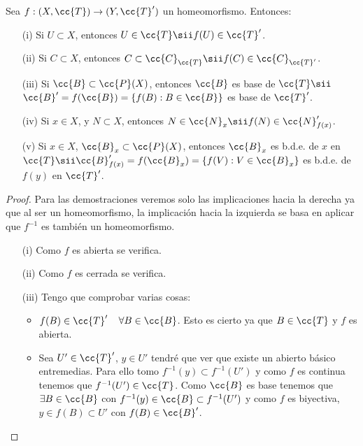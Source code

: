 \begin{prop}
    Sea $f:(X, \cc{T})\to (Y, \cc{T}')$ un homeomorfismo. Entonces:
    \begin{enumerate}
        \item[(i)] Si $U\subset X$, entonces $U\in \cc{T}\sii f(U)\in \cc{T}'$.
        \item[(ii)] Si $C\subset X$, entonces $C\subset \cc{C}_{\cc{T}} \sii f(C)\in \cc{C}_{\cc{T}'}$.
        \item[(iii)] Si $\cc{B}\subset\cc{P}(X)$, entonces $\cc{B}$ es base de $\cc{T} \sii $ $\cc{B}'=f(\cc{B})=\{f(B):B\in \cc{B}\}$ es base de $\cc{T}'$.
        \item[(iv)] Si $x\in X$, y $N\subset X$, entonces $N\in \cc{N}_x \sii f(N)\in \cc{N}_{f(x)}'$.
        \item[(v)] Si $x\in X$, $\cc{B}_x\subset \cc{P}(X)$, entonces $\cc{B}_x$ es b.d.e. de $x$ en $\cc{T} \sii \cc{B}_{f(x)}'=f(\cc{B}_x)=\{f(V):V\in \cc{B}_x\}$ es b.d.e. de $f(y)$ en $\cc{T}'$.     
    \end{enumerate}

    \begin{proof}
        Para las demostraciones veremos solo las implicaciones hacia la derecha ya que al ser un homeomorfismo, la implicación hacia la izquierda se basa en aplicar que $f^{-1}$ es también un homeomorfismo.

        \begin{enumerate}
            \item[(i)] Como $f$ es abierta se verifica.
            \item[(ii)] Como $f$ es cerrada se verifica.
            \item[(iii)] Tengo que comprobar varias cosas:
            \begin{itemize}
                \item $f(B)\in \cc{T}'$\ \ $\forall B \in \cc{B}$. Esto es cierto ya que $B\in \cc{T}$ y $f$ es abierta.
                \item Sea $U'\in \cc{T}'$, $y\in U'$ tendré que ver que existe un abierto básico entremedias. Para ello tomo $f^{-1}(y)\subset f^{-1}(U')$ y como $f$ es continua tenemos que $f^{-1}(U')\in \cc{T}$. Como $\cc{B}$ es base tenemos que $\exists B \in \cc{B}$ con $f^{-1}(y)\in \cc{B}\subset f^{-1}(U')$ y como $f$ es biyectiva, $y\in f(B)\subset U'$ con $f(B)\in \cc{B}'$.
            \end{itemize}
            \begin{center}
\end{center}
\end{enumerate}
\end{proof}
\end{prop}
